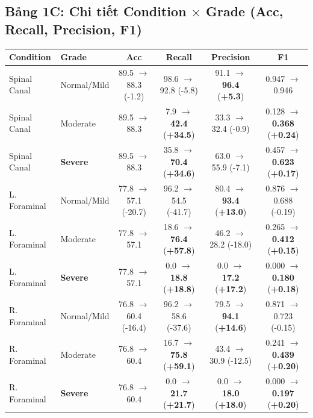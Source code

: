 \documentclass[11pt,a4paper]{article}
\newcommand{\good}[1]{\textcolor{good}{\textbf{#1}}}
\newcommand{\bad}[1]{\textcolor{bad}{#1}}
\begin{document}
\vspace{0.5em}
\subsection*{Bảng 1C: Chi tiết Condition $\times$ Grade (Acc, Recall, Precision, F1)}

\noindent\footnotesize
\begin{tabular}{@{}llcccc@{}}
\toprule
\rowcolor{tablehdr}
\textbf{Condition} & \textbf{Grade} & Acc & Recall & Precision & F1 \\
\midrule
Spinal Canal & Normal/Mild & 89.5 $\rightarrow$ 88.3 (\bad{-1.2}) & 98.6 $\rightarrow$ 92.8 (\bad{-5.8}) & 91.1 $\rightarrow$ \good{96.4} (\good{+5.3}) & 0.947 $\rightarrow$ 0.946 \\
Spinal Canal & Moderate & 89.5 $\rightarrow$ 88.3 & 7.9 $\rightarrow$ \good{42.4} (\good{+34.5}) & 33.3 $\rightarrow$ 32.4 (\bad{-0.9}) & 0.128 $\rightarrow$ \good{0.368} (\good{+0.24}) \\
Spinal Canal & \textbf{Severe} & 89.5 $\rightarrow$ 88.3 & 35.8 $\rightarrow$ \good{70.4} (\good{+34.6}) & 63.0 $\rightarrow$ 55.9 (\bad{-7.1}) & 0.457 $\rightarrow$ \good{0.623} (\good{+0.17}) \\
\midrule
L. Foraminal & Normal/Mild & 77.8 $\rightarrow$ 57.1 (\bad{-20.7}) & 96.2 $\rightarrow$ 54.5 (\bad{-41.7}) & 80.4 $\rightarrow$ \good{93.4} (\good{+13.0}) & 0.876 $\rightarrow$ 0.688 (\bad{-0.19}) \\
L. Foraminal & Moderate & 77.8 $\rightarrow$ 57.1 & 18.6 $\rightarrow$ \good{76.4} (\good{+57.8}) & 46.2 $\rightarrow$ 28.2 (\bad{-18.0}) & 0.265 $\rightarrow$ \good{0.412} (\good{+0.15}) \\
L. Foraminal & \textbf{Severe} & 77.8 $\rightarrow$ 57.1 & \bad{0.0} $\rightarrow$ \good{18.8} (\good{+18.8}) & \bad{0.0} $\rightarrow$ \good{17.2} (\good{+17.2}) & \bad{0.000} $\rightarrow$ \good{0.180} (\good{+0.18}) \\
\midrule
R. Foraminal & Normal/Mild & 76.8 $\rightarrow$ 60.4 (\bad{-16.4}) & 96.2 $\rightarrow$ 58.6 (\bad{-37.6}) & 79.5 $\rightarrow$ \good{94.1} (\good{+14.6}) & 0.871 $\rightarrow$ 0.723 (\bad{-0.15}) \\
R. Foraminal & Moderate & 76.8 $\rightarrow$ 60.4 & 16.7 $\rightarrow$ \good{75.8} (\good{+59.1}) & 43.4 $\rightarrow$ 30.9 (\bad{-12.5}) & 0.241 $\rightarrow$ \good{0.439} (\good{+0.20}) \\
R. Foraminal & \textbf{Severe} & 76.8 $\rightarrow$ 60.4 & \bad{0.0} $\rightarrow$ \good{21.7} (\good{+21.7}) & \bad{0.0} $\rightarrow$ \good{18.0} (\good{+18.0}) & \bad{0.000} $\rightarrow$ \good{0.197} (\good{+0.20}) \\
\bottomrule
\end{tabular}
\normalsize
\end{document}
